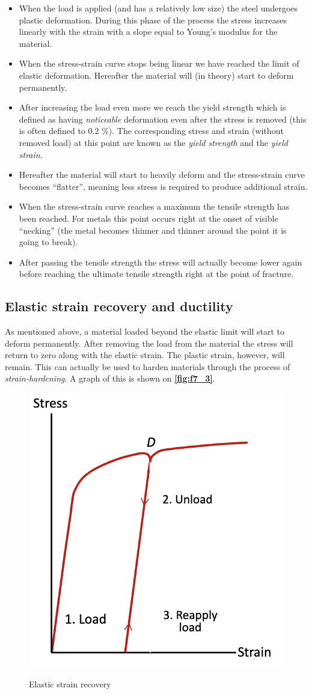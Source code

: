 \begin{itemize}
  \item When the load is applied (and has a relatively low size) the steel undergoes plastic deformation. During this phase of the process the stress increases linearly with the strain with a slope equal to Young's modulus for the material. 
  \item When the stress-strain curve stops being linear we have reached the limit of elastic deformation. Hereafter the material will (in theory) start to deform permanently.
  \item After increasing the load even more we reach the yield strength which is defined as having \textit{noticeable} deformation even after the stress is removed (this is often defined to \num{0,2} \%). The corresponding stress and strain (without removed load) at this point are known as the \textit{yield strength} and the \textit{yield strain}. 
  \item Hereafter the material will start to heavily deform and the stress-strain curve becomes ``flatter'', meaning less stress is required to produce additional strain.
  \item When the stress-strain curve reaches a maximum the tensile strength has been reached. For metals this point occurs right at the onset of visible ``necking'' (the metal becomes thinner and thinner around the point it is going to break). 
  \item After passing the tensile strength the stress will actually become lower again before reaching the ultimate tensile strength right at the point of fracture. 
\end{itemize}

\subsection{Elastic strain recovery and ductility}
As mentioned above, a material loaded beyond the elastic limit will start to deform permanently. After removing the load from the material the stress will return to zero along with the elastic strain. The plastic strain, however, will remain. This can actually be used to harden materials through the process of \textit{strain-hardening}. A graph of this is shown on \textbf{\autoref{fig:f7_3}}.

\begin{figure} [ht]
  \centering
  \caption{Elastic strain recovery}
  \includegraphics[width=0.5\linewidth]{./figures/f7_3.png}
  \label{fig:f7_3}
\end{figure}

